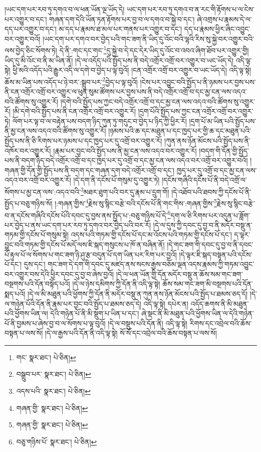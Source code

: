 །ཡང་དག་པར་རབ་ཏུ་དགའ་བ་ལ་ཕན་ཡོན་ལྔ་ཡོད་དེ། ཡང་དག་པར་རབ་ཏུ་དགའ་བ་ན་རང་གི་རྟོགས་པ་ལ་ངེས་པར་འགྱུར་བ་དང་། གཞན་དག་དེའི་ཡོན་ཏན་རྟོགས་པར་བྱ་བ་ལ་དགའ་བ་སྐྱེ་བ་དང་། ཞེ་འགྲས་པ་རྣམས་དེ་ལ་དད་པར་འགྱུར་བ་དང་། མ་དད་པ་རྣམས་ཐ་མལ་པར་གནས་པར་འགྱུར་བ་དང་། དད་པ་རྣམས་ཕྱིར་ཞིང་འབྱུང་བར་འགྱུར་བའོ། །ཡང་དག་པར་དགའ་བར་བྱེད་པའི་གང་ཟག་ནི་ཡིད་དུ་འོང་བའི་ལྷའི་རིས་སུ་སྐྱེ་བར་འགྱུར་བའི་ལས་བྱེད་ཅིང་སོགས་ཏེ། དེ་ནི་:གང་དང་གང་\footnote{གང་  སྣར་ཐང་།  པེ་ཅིན། }དུ་སྐྱེ་བ་དེ་དང་དེར་ཡིད་དུ་འོང་བ་འབའ་ཞིག་ཐོབ་པར་འགྱུར་གྱི། ཡིད་དུ་མི་འོང་བ་ནི་མ་ཡིན་ནོ། །དེ་ལ་འདོད་པའི་སྤྱོད་པས་ནི་བདེ་འགྲོར་འགྲོ་བར་འགྱུར་བ་ཡང་ཡོད་དེ། འདི་ལྟ་སྟེ། ཕྱི་མའི་འདོད་པའི་རྒྱུར་འདི་ལ་དགེ་བ་བྱེད་པ་ལྟ་བུའོ། །ངན་འགྲོར་འགྲོ་བར་འགྱུར་བ་ཡང་ཡོད་དེ། འདི་ལྟ་སྟེ། ཆོས་མ་ཡིན་པས་འདོད་པ་ཉེ་བར་:སྒྲུབ་པར་\footnote{བསྒྲུབ་པར་  སྣར་ཐང་།  པེ་ཅིན། }བྱེད་པ་ལྟ་བུའོ། །ངེས་པར་འབྱུང་བའི་སྤྱོད་པ་ནི་ཉམས་པར་བྱས་པས་ནི་ངན་འགྲོར་འགྲོ་བར་འགྱུར་ལ་ཕུན་སུམ་ཚོགས་པར་བྱས་པས་ནི་བདེ་འགྲོར་འགྲོ་བ་དང་མྱ་ངན་ལས་འདའ་བའི་ཚོགས་སུ་འགྱུར་རོ། །དགེ་བའི་སྤྱོད་པས་ཀྱང་བདེ་འགྲོར་འགྲོ་བ་དང་མྱ་ངན་ལས་འདའ་བའི་ཚོགས་སུ་འགྱུར་རོ། །མི་དགེ་བའི་སྤྱོད་པས་ནི་ངན་འགྲོར་འགྲོ་བར་འགྱུར་རོ། །དྲག་པོའི་སྤྱོད་པས་ཀྱང་ངན་འགྲོར་འགྲོ་བར་འགྱུར་ཏེ། ལོག་པར་ལྟ་བ་ལ་བརྟེན་པས་བདག་ཉིད་ཀུན་ཏུ་གདུང་བ་བྱེད་པ་ཉིད་ཀྱི་ཕྱིར་རོ། །དྲག་པོ་མ་ཡིན་པའི་སྤྱོད་པས་ནི་མྱ་ངན་ལས་འདའ་བའི་ཚོགས་སུ་འགྱུར་རོ། །ཉམས་པའི་ཆ་དང་མཐུན་པ་དང་ཁྱད་པར་གྱི་ཆ་དང་མཐུན་པའི་སྤྱོད་པས་ནི་ཅི་རིགས་པར་ཉམས་པ་དང་ཁྱད་པར་དུ་འགྲོ་བར་འགྱུར་རོ། །ཀུན་ནས་ཉོན་མོངས་པའི་སྤྱོད་པས་ནི་འཁོར་བར་འགྱུར་རོ། །རྣམ་པར་བྱང་བའི་སྤྱོད་པས་ནི་མྱ་ངན་ལས་འདའ་བར་འགྱུར་རོ། །བདག་གི་དོན་གྱི་སྤྱོད་པས་ནི་བདག་ཉིད་བདེ་འགྲོར་འགྲོ་བ་དང་ཁྱད་པར་དུ་འགྲོ་བ་དང་མྱ་ངན་ལས་འདའ་བར་འགྲོ་བར་འགྱུར་བའོ། །གཞན་གྱི་དོན་གྱི་སྤྱོད་པས་ནི་བདག་དང་གཞན་དག་བདེ་འགྲོར་འགྲོ་བ་དང་། ཁྱད་པར་དུ་འགྲོ་བ་དང་མྱ་ངན་ལས་འདའ་བར་འགྲོ་བར་འགྱུར་རོ། །དེ་དག་ནི་དངོས་པོ་གསུམ་དུ་འགྱུར་ཏེ། །དངོས་གཞིའི་དངོས་པོ་ནི་བདེ་འགྲོ་ལ་སོགས་པ་མྱ་ངན་ལས་:འདའ་བའི་\footnote{འདས་པའི་  སྣར་ཐང་།  པེ་ཅིན། }མཐར་ཐུག་པའི་བར་དུ་རྣམ་པ་དྲུག་གོ། །དེ་འཐོབ་པའི་ཐབས་ཀྱི་དངོས་པོ་ནི་སྤྱོད་པ་བཅུ་གཉིས་སོ། །:གཞན་གྱིས་\footnote{གཞན་གྱི་  སྣར་ཐང་།  པེ་ཅིན། }རྗེས་སུ་སྙིང་བརྩེ་བའི་དངོས་པོ་ནི་གང་གིས་:གཞན་གྱིས་\footnote{གཞན་གྱི་  སྣར་ཐང་།  པེ་ཅིན། }རྗེས་སུ་སྙིང་བརྩེ་བ་ན་དངོས་གཞིའི་དངོས་པོའི་དབང་དུ་བྱས་ནས་སྤྱོད་པ་:བཅུ་གཉིས་པོ་དེ་\footnote{བཅུ་གཉིས་པོ་  སྣར་ཐང་།  པེ་ཅིན། }དག་ལ་ཅི་རིགས་པར་འདུན་པ་ཟློག་པར་བྱེད་པ་ནས་ཡང་དག་པར་རབ་ཏུ་དགའ་བར་བྱེད་པའི་བར་རོ། །དེ་ལ་དུས་ཀྱི་དབང་དུ་བྱ་བ་ནི་མདོར་བསྡུ་ན་གཏམ་གྱི་དངོས་པོ་གསུམ་སྟེ། འདས་པའི་གཏམ་གྱི་དངོས་པོ་དང་མ་འོངས་པའི་གཏམ་གྱི་དངོས་པོ་དང་། ད་ལྟར་བྱུང་བའི་གཏམ་གྱི་དངོས་པོ་མདོ་ལས་ཇི་སྐད་གསུངས་པ་ཁོ་ན་བཞིན་ནོ། །དེ་གང་ཟག་གི་དབང་དུ་བྱ་བ་ནི་དབང་པོ་རྟུལ་པོ་ལ་སོགས་པ་གང་ཟག་ཉི་ཤུ་རྩ་བདུན་པོ་དག་ཡིན་པར་རིག་པར་བྱའོ། །དེ་ལྟར་ཇི་སྐད་བསྟན་པའི་དངོས་པོ་དང་། དུས་དང་། གང་ཟག་དེ་དག་གི་དབང་དུ་མཛད་ནས་སངས་རྒྱས་བཅོམ་ལྡན་འདས་རྣམས་ཀྱི་གཏམ་འབྱུང་བར་འགྱུར་བས་དེའི་ཕྱིར་དབང་དུ་བྱ་བ་ཞེས་བྱའོ། །དེ་ལ་ཕན་ཡོན་གྱི་དོན་མདོར་བསྡུ་ན་ཆོས་སམ་གང་ཟག་བསྔགས་པའི་དོན་བསྟོད་པའོ། །དེ་ལ་ཉེས་དམིགས་ཀྱི་དོན་ནི་འདི་ལྟ་སྟེ། ཆོས་སམ་གང་ཟག་མི་བསྔགས་པའི་དོན་སྨད་པའོ། །དེ་ལ་མི་མཐུན་པའི་ཕྱོགས་ཀྱི་དོན་ནི་མདོར་བསྡུ་ན་ཀུན་ནས་ཉོན་མོངས་པའི་སྤྱོད་པ་ཐམས་ཅད་དོ། །དེ་ལ་གཉེན་པོའི་དོན་ནི་རྣམ་པར་བྱང་བའི་སྤྱོད་པ་ཐམས་ཅད་དེ། འདི་ལྟ་སྟེ། དཔེར་ན། འདོད་ཆགས་ནི་མི་མཐུན་པའི་ཕྱོགས་ཡིན་ལ། དེའི་གཉེན་པོ་ནི་མི་སྡུག་པ་ཡིན་པ་དང་། ཞེ་སྡང་ནི་མི་མཐུན་པའི་ཕྱོགས་ཡིན་ལ་དེའི་གཉེན་པོ་ནི་བྱམས་པ་ཞེས་བྱ་བ་ལ་སོགས་པ་ལྟ་བུའོ། །དེ་ལ་བསྡུས་པའི་དོན་ནི། འདི་ལྟ་སྟེ། རིགས་དང་འབྲེལ་བའི་ཆོས་བསྟན་པ་ལས་སོ། །དེ་ལ་རྒྱས་པའི་དོན་ནི་འདི་ལྟ་སྟེ། སོ་སོ་དང་འབྲེལ་བའི་ཆོས་བསྟན་པ་ལས་སོ། 
